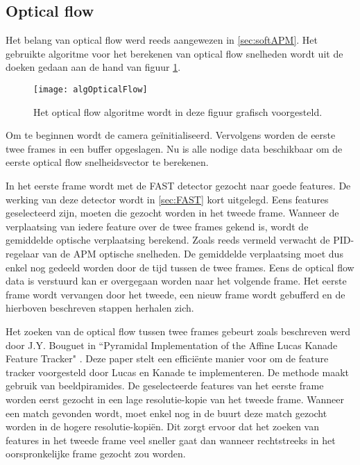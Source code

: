 \subsection{Optical flow} \label{sec:OptFlow}
Het belang van optical flow werd reeds aangewezen in \ref{sec:softAPM}. Het gebruikte algoritme voor het berekenen van optical flow snelheden wordt uit de doeken gedaan aan de hand van figuur \ref{fig:algOptFlow}.
\begin{figure}[h]
	\centering
	\texttt{[image: algOpticalFlow]}
	\caption{Het optical flow algoritme wordt in deze figuur grafisch voorgesteld.} \label{fig:algOptFlow}
\end{figure}

\npar Om te beginnen wordt de camera ge\"initialiseerd. Vervolgens worden de eerste twee frames in een buffer opgeslagen. Nu is alle nodige data beschikbaar om de eerste optical flow snelheidsvector te berekenen. 

\npar In het eerste frame wordt met de FAST detector \cite{paper:FAST} gezocht naar goede features. De werking van deze detector wordt in \ref{sec:FAST} kort uitgelegd. Eens features geselecteerd zijn, moeten die gezocht worden in het tweede frame. Wanneer de verplaatsing van iedere feature over de twee frames gekend is, wordt de gemiddelde optische verplaatsing berekend. Zoals reeds vermeld verwacht de PID-regelaar van de APM optische snelheden. De gemiddelde verplaatsing moet dus enkel nog gedeeld worden door de tijd tussen de twee frames. Eens de optical flow data is verstuurd kan er overgegaan worden naar het volgende frame. Het eerste frame wordt vervangen door het tweede, een nieuw frame wordt gebufferd en de hierboven beschreven stappen herhalen zich.

\npar Het zoeken van de optical flow tussen twee frames gebeurt zoals beschreven werd door J.Y. Bouguet in ``Pyramidal Implementation of the Affine Lucas Kanade Feature Tracker" \cite{paper:PyrLK}. Deze paper stelt een effici\"ente manier voor om de feature tracker voorgesteld door Lucas en Kanade \cite{paper:LK} te implementeren. De methode maakt gebruik van beeldpiramides. De geselecteerde features van het eerste frame worden eerst gezocht in een lage resolutie-kopie van het tweede frame. Wanneer een match gevonden wordt, moet enkel nog in de buurt deze match gezocht worden in de hogere resolutie-kopi\"en. Dit zorgt ervoor dat het zoeken van features in het tweede frame veel sneller gaat dan wanneer rechtstreeks in het oorspronkelijke frame gezocht zou worden.

